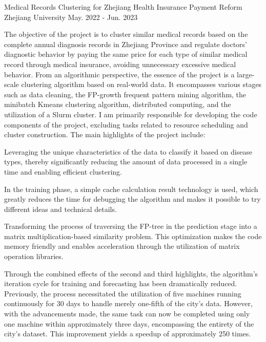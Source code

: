 
\begin{cventries}
	\cventry
	{} %
	{Medical Records Clustering for Zhejiang Health Insurance Payment Reform} %
	{Zhejiang University} %
	{May. 2022 - Jun. 2023} %
	{
		\quad The objective of the project is to cluster similar medical records based on the complete annual diagnosis records in Zhejiang Province and regulate doctors' diagnostic behavior by paying the same price for each type of similar medical record through medical insurance, avoiding unnecessary excessive medical behavior. \newline
		\quad From an algorithmic perspective, the essence of the project is a large-scale clustering algorithm based on real-world data. It encompasses various stages such as data cleaning, the FP-growth frequent pattern mining algorithm, the minibatch Kmeans clustering algorithm, distributed computing, and the utilization of a Slurm cluster. I am primarily responsible for developing the code components of the project, excluding tasks related to resource scheduling and cluster construction. \newline
		The main highlights of the project include: \newline
		\vspace{3.5mm}
		\begin{cvitems} %
			\item{Leveraging the unique characteristics of the data to classify it based on disease types, thereby significantly reducing the amount of data processed in a single time and enabling efficient clustering.}
			\item{In the training phase, a simple cache calculation result technology is used, which greatly reduces the time for debugging the algorithm and makes it possible to try different ideas and technical details.}
			\item{Transforming the process of traversing the FP-tree in the prediction stage into a matrix multiplication-based similarity problem. This optimization makes the code memory friendly and enables acceleration through the utilization of matrix operation libraries.}
			\item {Through the combined effects of the second and third highlights, the algorithm's iteration cycle for training and forecasting has been dramatically reduced. Previously, the process necessitated the utilization of five machines running continuously for 30 days to handle merely one-fifth of the city's data. However, with the advancements made, the same task can now be completed using only one machine within approximately three days, encompassing the entirety of the city's dataset. This improvement yields a speedup of approximately 250 times.}
		\end{cvitems}
	}


\end{cventries}
